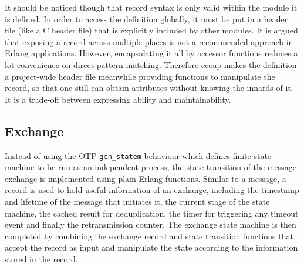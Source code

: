 
It should be noticed though that record syntax is only valid within the module it is defined. In order to access the definition globally, it must be put in a header file (like a C header file) that is explicitly included by other modules. It is argued that exposing a record across multiple places is not a recommended approach in Erlang applications. However, encapsulating it all by accessor functions reduces a lot convenience on direct pattern matching. Therefore ecoap makes the definition a project-wide header file meanwhile providing functions to manipulate the record, so that one still can obtain attributes without knowing the innards of it. It is a trade-off between expressing ability and maintainability. 

\subsection{Exchange}\label{exchange_implementation}

Instead of using the OTP \verb|gen_statem| behaviour which defines finite state machine to be run as an independent process, the state transition of the message exchange is implemented using plain Erlang functions. Similar to a message, a record is used to hold useful information of an exchange, including the timestamp and lifetime of the message that initiates it, the current stage of the state machine, the cached result for deduplication, the timer for triggering any timeout event and finally the retransmission counter. The exchange state machine is then completed by combining the exchange record and state transition functions that accept the record as input and manipulate the state according to the information stored in the record.

